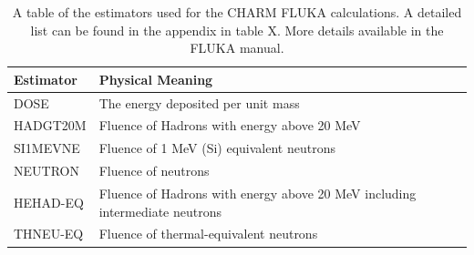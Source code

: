 \begin{table}[htbp]
  \centering
    \begin{tabular}{l|p{9cm}}
	Estimator & Physical Meaning \\
	\hline
	\hline
	DOSE		& The energy deposited per unit mass \\
	HADGT20M	& Fluence of Hadrons with energy above 20 MeV \\
	SI1MEVNE	& Fluence of 1 MeV (Si) equivalent neutrons \\
	NEUTRON		& Fluence of neutrons \\
	HEHAD-EQ	& Fluence of Hadrons with energy above 20 MeV including intermediate neutrons \\
	THNEU-EQ	& Fluence of thermal-equivalent neutrons \\
    \end{tabular}
	\caption{A table of the estimators used for the CHARM FLUKA calculations. A detailed list can be found in the appendix in table X. More details available in the FLUKA manual.}
	\label{tab:fluka_estimators}
\end{table}